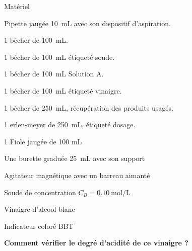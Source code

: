 \documentclass[11pt,a4paper]{article}
\newenvironment{itemize*}%
    {\begin{itemize}%
      \setlength{\itemsep}{0pt}%
      \setlength{\parskip}{0pt}}%
    {\end{itemize}}
\begin{document}
\begin{minipage}{.5\textwidth}%
    
 \begin{bclogo}[couleur=white,  arrondi =0.1 , logo = \bcinfo, epBarre =2]{ Matériel }

\begin{itemize*}

\item Pipette jaugée \SI{10}{\milli\liter} avec son dispositif d'aspiration.  

\item 1 bécher de \SI{100}{\milli\liter}.

\item 1 bécher de \SI{100}{\milli\liter} étiqueté soude.

\item 1 bécher de \SI{100}{\milli\liter} Solution A.

\item 1 bécher de \SI{100}{\milli\liter} étiqueté vinaigre. 

\item 1 bécher de \SI{250}{\milli\liter}, récupération des produits usagés. 

\item 1 erlen-meyer de \SI{250}{\milli\liter}, étiqueté dosage. 


\item 1 Fiole jaugée de 100 mL

\item  Une burette graduée \SI{25}{\milli\liter} avec son support 

\item Agitateur magnétique avec un barreau aimanté

\item Soude de concentration $C_B =\SI{0,10}{\mol/\liter}$
\item Vinaigre d'alcool blanc

\item Indicateur coloré BBT


\end{itemize*}
\end{bclogo}

\end{minipage}%

\vfill 

\begin{mybox}
\begin{center}    
\textbf{\large Comment vérifier le degré d'acidité de ce vinaigre ?}\end{center}
\end{mybox}
\end{document}
